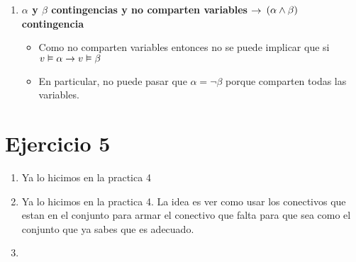 \documentclass[14pt,a4paper,fleqn]{article}
\begin{document}
\begin{enumerate}
\begin{itemize}
	\end{itemize}
	\item \textbf{$\alpha$ y $\beta$ contingencias y no comparten variables $\rightarrow$ $(\alpha \wedge \beta)$ contingencia}
	\begin{itemize}
		\item Como no comparten variables entonces no se puede implicar que si $v \vDash \alpha \rightarrow v \vDash \beta$
		\item En particular, no puede pasar que $\alpha = \neg \beta$ porque comparten todas las variables.
	\end{itemize}
\end{enumerate}
\section*{Ejercicio 5}
\begin{enumerate}
	\item Ya lo hicimos en la practica 4
	\item Ya lo hicimos en la practica 4. La idea es ver como usar los conectivos que estan en el conjunto para armar el conectivo que falta para que sea como el conjunto que ya sabes que es adecuado.
	\item 
\end{enumerate}
\end{document}
